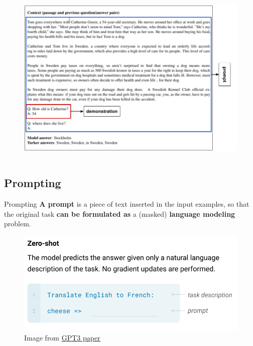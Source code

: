 \documentclass[12pt,aspectratio=169,handout]{beamer}
\begin{document}
\begin{frame}
	\begin{figure}[h]
		\includegraphics[height=8.5cm]{gpt2-prompt-anno}
	\end{figure}
\end{frame}

\subsection{Prompting}

\begin{frame}{Prompting}
	\textbf{A prompt} is a piece of text inserted in the input examples, so that the original task \textbf{can be formulated as} a (masked) \textbf{language modeling} problem.

	\pause

	\begin{figure}[h]
		\includegraphics[height=5cm]{zero-shot-translation-gpt3}
		\caption*{Image from \href{https://arxiv.org/pdf/2005.14165.pdf}{\underline{GPT3 paper}}}
	\end{figure}
	
\end{frame}
\end{document}
